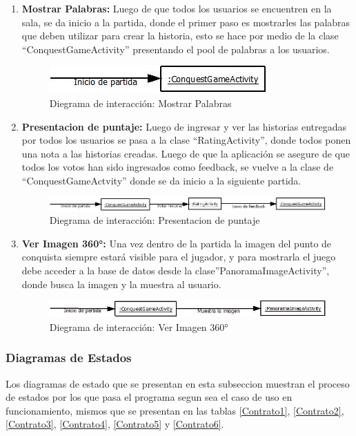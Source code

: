 \documentclass[12pt]{article}
\begin{document}
\begin{enumerate}[1.]
	\item \textbf{Mostrar Palabras:}
Luego de que todos los usuarios se encuentren en la sala, se da inicio a la partida, donde el primer paso es mostrarles las palabras que deben utilizar para crear la historia, esto se hace por medio de la clase “ConquestGameActivity” presentando el pool de palabras a los usuarios.
	\begin{figure}[H]
		\centering
		\includegraphics[scale=1]{imgs/Mostrar Palabras.jpeg}
		\caption{Diegrama de interacción: Mostrar Palabras}
	\end{figure}

	\item \textbf{Presentacion de puntaje:}
Luego de ingresar y ver las historias entregadas por todos los usuarios se pasa a la clase “RatingActivity”, donde todos ponen una nota a las historias creadas. Luego de que la aplicación se asegure de que todos los votos han sido ingresados como feedback, se vuelve a la clase de “ConquestGameActvity” donde se da inicio a la siguiente partida.
	\begin{figure}[H]
		\centering
		\includegraphics[scale=0.8]{imgs/Presentacion de puntaje.jpeg}
		\caption{Diegrama de interacción: Presentacion de puntaje}
	\end{figure}

	\item \textbf{Ver Imagen 360°:}
Una vez dentro de la partida la imagen del punto de conquista siempre estará visible para el jugador, y para mostrarla el juego debe acceder a la base de datos desde la clase”PanoramaImageActivity”, donde busca la imagen y la muestra al usuario.

	\begin{figure}[H]
		\centering
		\includegraphics[scale=1]{imgs/Ver Imagen 360.jpeg}
		\caption{Diegrama de interacción: Ver Imagen 360°}
	\end{figure}
\end{enumerate}
\subsubsection{Diagramas de Estados}
Los diagramas de estado que se presentan en esta subseccion muestran el proceso de estados por los que pasa el programa segun sea el caso de uso en funcionamiento, mismos que se presentan en las tablas \ref{Contrato1}, \ref{Contrato2}, \ref{Contrato3}, \ref{Contrato4}, \ref{Contrato5} y \ref{Contrato6}.
\bigskip
\end{document}
